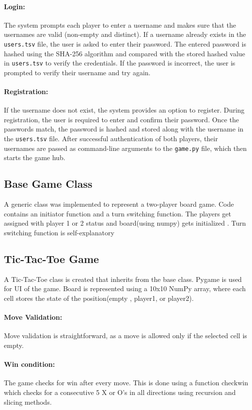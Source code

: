\documentclass[12pt,a4paper]{article}
\begin{document}
\paragraph{Login:}
The system prompts each player to enter a username and makes sure that the usernames are valid (non-empty and distinct). If a username already exists in the \texttt{users.tsv} file, the user is asked to enter their password. The entered password is hashed using the SHA-256 algorithm and compared with the stored hashed value in \texttt{users.tsv} to verify the credentials. If the password is incorrect, the user is prompted to verify their username and try again.

\paragraph{Registration:}
If the username does not exist, the system provides an option to register. During registration, the user is required to enter and confirm their password. Once the passwords match, the password is hashed and stored along with the username in the \texttt{users.tsv} file.
After successful authentication of both players, their usernames are passed as command-line arguments to the \texttt{game.py} file, which then starts the game hub.

\subsection{Base Game Class}
A generic class was implemented to represent a two-player board game. Code contains an initiator function and a turn switching function. The players get assigned with player 1 or 2 status and board(using numpy) gets initialized . Turn switching function is self-explanatory 

\subsection{Tic-Tac-Toe Game}
A Tic-Tac-Toe class is created that inherits from the base class. Pygame is used for UI of the game. Board is represented using a 10x10 NumPy array, where each cell stores the state of the position(empty , player1, or player2).
\paragraph{Move Validation:}
Move validation is straightforward, as a move is allowed only if the selected cell is empty.
\paragraph{Win condition:}
The game checks for win after every move. This is done using a function checkwin which checks for a consecutive 5 X or O's in all directions using recursion and slicing methods.
\end{document}
